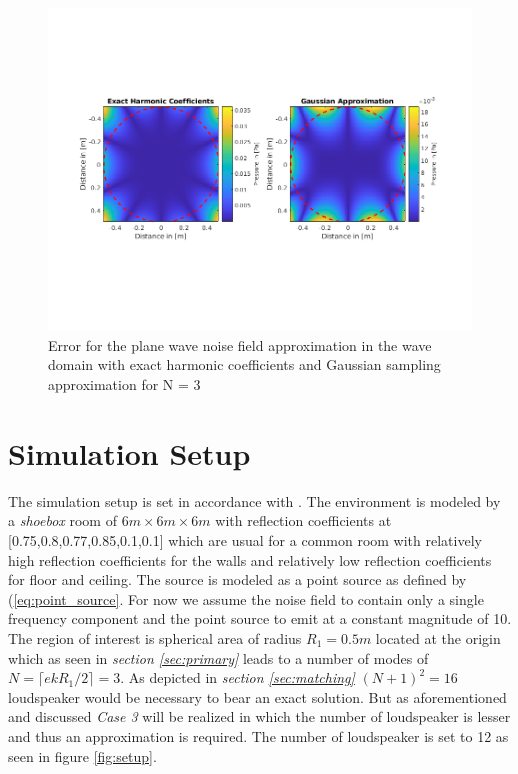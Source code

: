 \begin{figure}[H]
    \centerline{\includegraphics[width=180mm,keepaspectratio]{LaTeX/images/plots/Gauss_Approximation_Error.png}}
    \caption{Error for the plane wave noise field approximation in the wave domain with exact harmonic coefficients and Gaussian sampling approximation for N = 3}
    \label{fig:GaussianApproximationError}
\end{figure}

\section{Simulation Setup}
The simulation setup is set in accordance with \cite{Zhang2019}. The environment is modeled by a \textit{shoebox} room of $6m \times 6m \times 6m$ with reflection coefficients at [0.75,0.8,0.77,0.85,0.1,0.1] which are usual for a common room with relatively high reflection coefficients for the walls and relatively low reflection coefficients for floor and ceiling. The source is modeled as a point source as defined by (\ref{eq:point_source}. For now we assume the noise field to contain only a single frequency component and the point source to emit at a constant magnitude of 10.\\ The region of interest is spherical area of radius $R_1 = 0.5m$ located at the origin which as seen in \textit{section \ref{sec:primary}} leads to a number of modes of $N = \lceil ekR_1/2\rceil = 3$. As depicted in \textit{section \ref{sec:matching}} $(N+1)^2 = 16$ loudspeaker would be necessary to bear an exact solution. But as aforementioned and discussed \textit{Case 3} will be realized in which the number of loudspeaker is lesser and thus an approximation is required. The number of loudspeaker is set to 12 as seen in figure \ref{fig:setup}.

